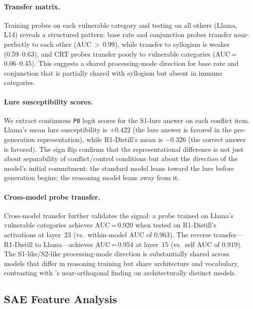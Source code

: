 \documentclass[accepted]{article}
\newcommand{\sone}{S1-like}
\newcommand{\stwo}{S2-like}
\newcommand{\pzero}{\texttt{P0}}
\begin{document}
\paragraph{Transfer matrix.}
Training probes on each vulnerable category and testing on all others
(Llama, L14) reveals a structured pattern: base rate and conjunction
probes transfer near-perfectly to each other (AUC\,$>$\,0.99), while
transfer to syllogism is weaker (0.59--0.63), and CRT probes transfer
poorly to vulnerable categories (AUC\,=\,0.06--0.45).  This suggests a
shared processing-mode direction for base rate and conjunction that is
partially shared with syllogism but absent in immune categories.

\paragraph{Lure susceptibility scores.}
We extract continuous \pzero{} logit scores for the S1-lure answer on
each conflict item.  Llama's mean lure susceptibility is $+0.422$
(the lure answer is favored in the pre-generation representation),
while R1-Distill's mean is $-0.326$ (the correct answer is favored).
The sign flip confirms that the representational difference is not just
about separability of conflict/control conditions but about the
\emph{direction} of the model's initial commitment: the standard model
leans toward the lure before generation begins; the reasoning model leans
away from it.

\paragraph{Cross-model probe transfer.}
Cross-model transfer further validates the signal: a probe trained on
Llama's vulnerable categories achieves AUC\,=\,0.920 when tested on
R1-Distill's activations at layer~23 (vs.\ within-model AUC of 0.963).
The reverse transfer---R1-Distill to Llama---achieves AUC\,=\,0.954 at
layer~15 (vs.\ self AUC of 0.919).  The \sone{}/\stwo{} processing-mode
direction is substantially shared across models that differ in reasoning
training but share architecture and vocabulary, contrasting with
\citet{huang2026cogbias}'s near-orthogonal finding on architecturally
distinct models.

\subsection{SAE Feature Analysis}
\label{sec:results_sae}
\end{document}
